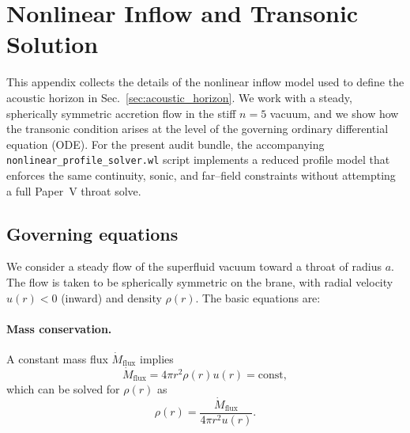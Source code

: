 \documentclass[11pt]{article}
\begin{document}
\section{Nonlinear Inflow and Transonic Solution}
\label{app:inflow}

This appendix collects the details of the nonlinear inflow model used to
define the acoustic horizon in Sec.~\ref{sec:acoustic_horizon}.  We work
with a steady, spherically symmetric accretion flow in the stiff
\(n=5\) vacuum, and we show how the transonic condition arises at the level
of the governing ordinary differential equation (ODE).  For the present
audit bundle, the accompanying \texttt{nonlinear\_profile\_solver.wl} script
implements a reduced profile model that enforces the same continuity, sonic,
and far--field constraints without attempting a full Paper~V throat solve.

\subsection{Governing equations}
\label{app:inflow-equations}

We consider a steady flow of the superfluid vacuum toward a throat of radius
\(a\).  The flow is taken to be spherically symmetric on the brane, with
radial velocity \(u(r) < 0\) (inward) and density \(\rho(r)\).  The basic
equations are:

\paragraph{Mass conservation.}
A constant mass flux \(\dot{M}_{\text{flux}}\) implies
\begin{equation}
  \dot{M}_{\text{flux}}
  = 4\pi r^2 \rho(r) u(r)
  = \text{const},
  \label{eq:inflow-mass-flux}
\end{equation}
which can be solved for \(\rho(r)\) as
\begin{equation}
  \rho(r)
  = \frac{\dot{M}_{\text{flux}}}{4\pi r^2 u(r)}.
  \label{eq:rho-from-u}
\end{equation}
\end{document}
